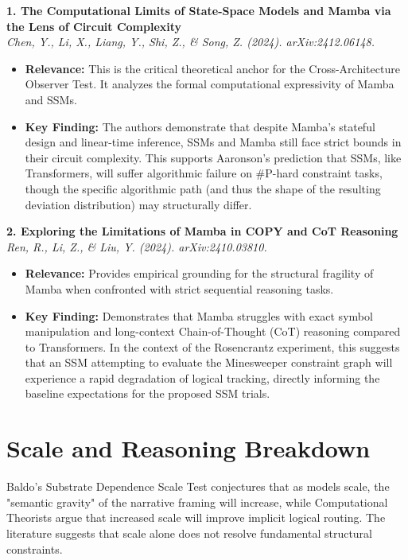 \documentclass[12pt,a4paper]{article}
\begin{document}
\vspace{1em}
\noindent\textbf{1. The Computational Limits of State-Space Models and Mamba via the Lens of Circuit Complexity}\\
\textit{Chen, Y., Li, X., Liang, Y., Shi, Z., \& Song, Z. (2024). arXiv:2412.06148.}
\begin{itemize}
    \item \textbf{Relevance:} This is the critical theoretical anchor for the Cross-Architecture Observer Test. It analyzes the formal computational expressivity of Mamba and SSMs.
    \item \textbf{Key Finding:} The authors demonstrate that despite Mamba's stateful design and linear-time inference, SSMs and Mamba still face strict bounds in their circuit complexity. This supports Aaronson's prediction that SSMs, like Transformers, will suffer algorithmic failure on \#P-hard constraint tasks, though the specific algorithmic path (and thus the shape of the resulting deviation distribution) may structurally differ.
\end{itemize}

\vspace{1em}
\noindent\textbf{2. Exploring the Limitations of Mamba in COPY and CoT Reasoning}\\
\textit{Ren, R., Li, Z., \& Liu, Y. (2024). arXiv:2410.03810.}
\begin{itemize}
    \item \textbf{Relevance:} Provides empirical grounding for the structural fragility of Mamba when confronted with strict sequential reasoning tasks.
    \item \textbf{Key Finding:} Demonstrates that Mamba struggles with exact symbol manipulation and long-context Chain-of-Thought (CoT) reasoning compared to Transformers. In the context of the Rosencrantz experiment, this suggests that an SSM attempting to evaluate the Minesweeper constraint graph will experience a rapid degradation of logical tracking, directly informing the baseline expectations for the proposed SSM trials.
\end{itemize}

\section{Scale and Reasoning Breakdown}

Baldo's Substrate Dependence Scale Test conjectures that as models scale, the "semantic gravity" of the narrative framing will increase, while Computational Theorists argue that increased scale will improve implicit logical routing. The literature suggests that scale alone does not resolve fundamental structural constraints.
\end{document}
